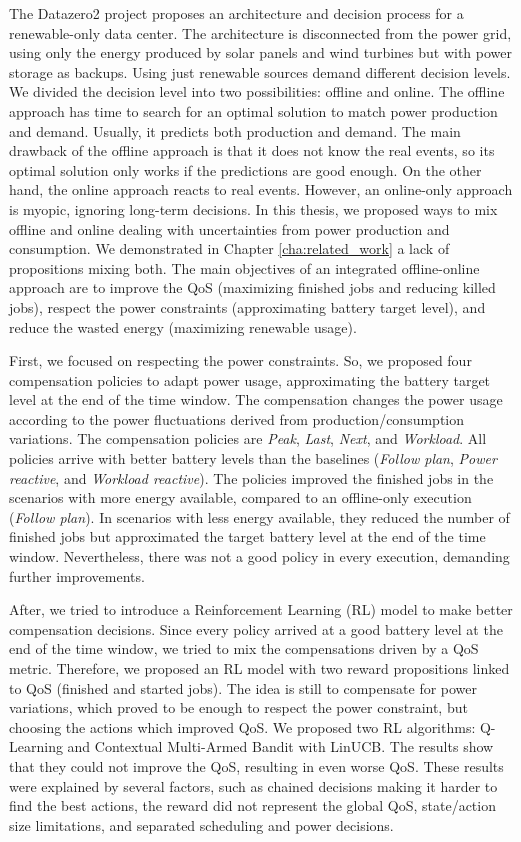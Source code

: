 The Datazero2 project proposes an architecture and decision process for a renewable-only data center. The architecture is disconnected from the power grid, using only the energy produced by solar panels and wind turbines but with power storage as backups. Using just renewable sources demand different decision levels. We divided the decision level into two possibilities: offline and online. The offline approach has time to search for an optimal solution to match power production and demand. Usually, it predicts both production and demand. The main drawback of the offline approach is that it does not know the real events, so its optimal solution only works if the predictions are good enough. On the other hand, the online approach reacts to real events. However, an online-only approach is myopic, ignoring long-term decisions. In this thesis, we proposed ways to mix offline and online dealing with uncertainties from power production and consumption. We demonstrated in Chapter \ref{cha:related_work} a lack of propositions mixing both. The main objectives of an integrated offline-online approach are to improve the QoS (maximizing finished jobs and reducing killed jobs), respect the power constraints (approximating battery target level), and reduce the wasted energy (maximizing renewable usage).

First, we focused on respecting the power constraints. So, we proposed four compensation policies to adapt power usage, approximating the battery target level at the end of the time window. The compensation changes the power usage according to the power fluctuations derived from production/consumption variations. The compensation policies are \emph{Peak}, \emph{Last}, \emph{Next}, and \emph{Workload}. All policies arrive with better battery levels than the baselines (\emph{Follow plan}, \emph{Power reactive}, and \emph{Workload reactive}). The policies improved the finished jobs in the scenarios with more energy available, compared to an offline-only execution (\emph{Follow plan}). In scenarios with less energy available, they reduced the number of finished jobs but approximated the target battery level at the end of the time window. Nevertheless, there was not a good policy in every execution, demanding further improvements.

After, we tried to introduce a Reinforcement Learning (RL) model to make better compensation decisions. Since every policy arrived at a good battery level at the end of the time window, we tried to mix the compensations driven by a QoS metric. Therefore, we proposed an RL model with two reward propositions linked to QoS (finished and started jobs). The idea is still to compensate for power variations, which proved to be enough to respect the power constraint, but choosing the actions which improved QoS. We proposed two RL algorithms: Q-Learning and Contextual Multi-Armed Bandit with LinUCB. The results show that they could not improve the QoS, resulting in even worse QoS. These results were explained by several factors, such as chained decisions making it harder to find the best actions, the reward did not represent the global QoS, state/action size limitations, and separated scheduling and power decisions.

